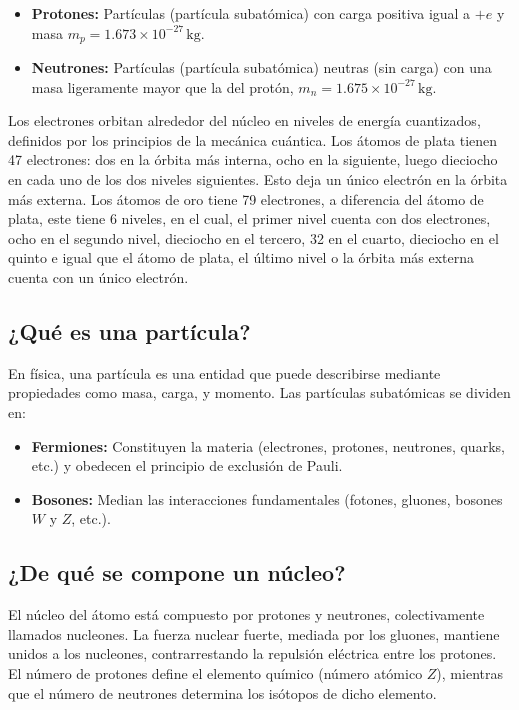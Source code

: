 \begin{itemize}
    \item \textbf{Protones:} Partículas (partícula subatómica) con carga positiva igual a $+e$ y masa $m_p = 1.673 \times 10^{-27} \, \text{kg}$.
    \item \textbf{Neutrones:} Partículas (partícula subatómica) neutras (sin carga) con una masa ligeramente mayor que la del protón, $m_n = 1.675 \times 10^{-27} \, \text{kg}$.
\end{itemize}
\noindent 
Los electrones orbitan alrededor del núcleo en niveles de energía cuantizados, definidos por los principios de la mecánica cuántica. Los átomos de plata tienen 47 electrones: dos en la órbita más interna, ocho en la siguiente, luego dieciocho en cada uno de los dos niveles siguientes. Esto deja un único electrón en la órbita más externa. Los átomos de oro tiene 79 electrones, a diferencia del átomo de plata, este tiene 6 niveles, en el cual, el primer nivel cuenta con dos electrones, ocho en el segundo nivel, dieciocho  en el tercero, 32 en el cuarto, dieciocho  en el quinto e igual que el átomo de plata, el último nivel o la órbita más externa cuenta con un único electrón.

\subsection*{¿Qué es una partícula?}
\noindent 
En física, una partícula es una entidad que puede describirse mediante propiedades como masa, carga, y momento. Las partículas subatómicas se dividen en:

\begin{itemize}
    \item \textbf{Fermiones:} Constituyen la materia (electrones, protones, neutrones, quarks, etc.) y obedecen el principio de exclusión de Pauli.
    \item \textbf{Bosones:} Median las interacciones fundamentales (fotones, gluones, bosones $W$ y $Z$, etc.).
\end{itemize}

\subsection*{¿De qué se compone un núcleo?}
\noindent 
El núcleo del átomo está compuesto por protones y neutrones, colectivamente llamados nucleones. La fuerza nuclear fuerte, mediada por los gluones, mantiene unidos a los nucleones, contrarrestando la repulsión eléctrica entre los protones. El número de protones define el elemento químico (número atómico $Z$), mientras que el número de neutrones determina los isótopos de dicho elemento.



